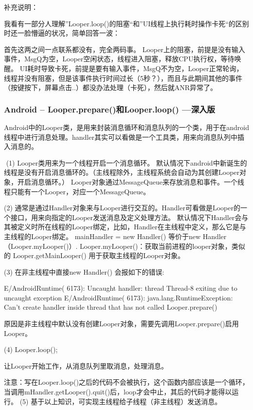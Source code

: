 \documentclass[9pt, b5paper]{article}
\begin{document}
补充说明：

我看有一部分人理解”Looper.loop()的阻塞“和”UI线程上执行耗时操作卡死“的区别时还一脸懵逼的状况，简单回答一波：

首先这两之间一点联系都没有，完全两码事。
Looper上的阻塞，前提是没有输入事件，MsgQ为空，Looper空闲状态，线程进入阻塞，释放CPU执行权，等待唤醒。
UI耗时导致卡死，前提是要有输入事件，MsgQ不为空，Looper正常轮询，线程并没有阻塞，但是该事件执行时间过长（5秒？），而且与此期间其他的事件（按键按下，屏幕点击..）都没办法处理（卡死），然后就ANR异常了。
\subsubsection{Android -- Looper.prepare()和Looper.loop() —深入版}
\label{sec-2-3-2}
Android中的Looper类，是用来封装消息循环和消息队列的一个类，用于在android线程中进行消息处理。handler其实可以看做是一个工具类，用来向消息队列中插入消息的。

​ (1) Looper类用来为一个线程开启一个消息循环。 默认情况下android中新诞生的线程是没有开启消息循环的。（主线程除外，主线程系统会自动为其创建Looper对象，开启消息循环。） Looper对象通过MessageQueue来存放消息和事件。一个线程只能有一个Looper，对应一个MessageQueue。

(2) 通常是通过Handler对象来与Looper进行交互的。Handler可看做是Looper的一个接口，用来向指定的Looper发送消息及定义处理方法。 默认情况下Handler会与其被定义时所在线程的Looper绑定，比如，Handler在主线程中定义，那么它是与主线程的Looper绑定。 mainHandler = new Handler() 等价于new Handler（Looper.myLooper()）. Looper.myLooper()：获取当前进程的looper对象，类似的 Looper.getMainLooper() 用于获取主线程的Looper对象。

(3) 在非主线程中直接new Handler() 会报如下的错误:

E/AndroidRuntime( 6173): Uncaught handler: thread Thread-8 exiting due to uncaught exception E/AndroidRuntime( 6173): java.lang.RuntimeException: Can't create handler inside thread that has not called Looper.prepare()

原因是非主线程中默认没有创建Looper对象，需要先调用Looper.prepare()启用Looper。

(4) Looper.loop();

让Looper开始工作，从消息队列里取消息，处理消息。

注意：写在Looper.loop()之后的代码不会被执行，这个函数内部应该是一个循环，当调用mHandler.getLooper().quit()后，loop才会中止，其后的代码才能得以运行。
(5) 基于以上知识，可实现主线程给子线程（非主线程）发送消息。
\end{document}
